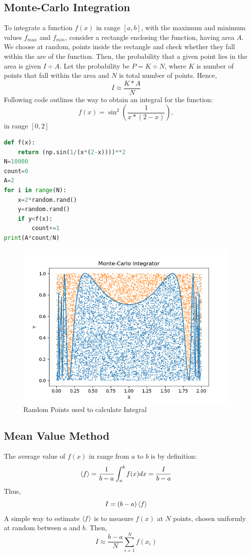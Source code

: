 \subsection{Monte-Carlo Integration}
To integrate a function $f(x)$ in range $[a,b]$, with the maximum and minimum values $f_{max}$ and $f_{min}$, consider a rectangle enclosing the function, having area $A$. We choose at random, points inside the rectangle and check whether they fall within the are of the function. Then, the probability that a given point lies in the area is given $I\div A$. Let the probability be $P=K \div N$, where $K$ is number of points that fall within the area and $N$ is total number of points. Hence,
$$I \approx \dfrac{K*A}{N}$$
Following code outlines the way to obtain an integral for the function:
$$f(x) = \sin^{2} \left(\dfrac{1}{x*(2-x)}\right),$$ in range $[0,2]$
\begin{lstlisting}[language=Python, caption=Monte Carlo Integration, frame=single, label={lst:montecarlo} ]
def f(x):
	return (np.sin(1/(x*(2-x))))**2
N=10000
count=0
A=2
for i in range(N):
	x=2*random.rand()
	y=random.rand()
	if y<f(x):
		count+=1
print(A*count/N)
\end{lstlisting}
\begin{figure}[H]
	\centering
	\includegraphics[width=0.7\linewidth]{MonteCarlo}
	\caption{Random Points used to calculate Integral}
	\label{fig:montecarlo}
\end{figure}
\subsection{Mean Value Method}
The average value of $f(x)$ in range from $a$ to $b$ is by definition:
$$\braket{f}= \dfrac{1}{b-a}\int_{a}^{b}f(x)dx=\dfrac{I}{b-a}$$
Thus, $$I = (b-a)\braket{f}$$
A simple way to estimate $\braket{f}$ is to measure $f(x)$ at $N$ points, chosen uniformly at random between $a$ and $b$. Then,
$$I \approx \dfrac{b-a}{N}\sum_{i=1}^{N}f(x_{i})$$




